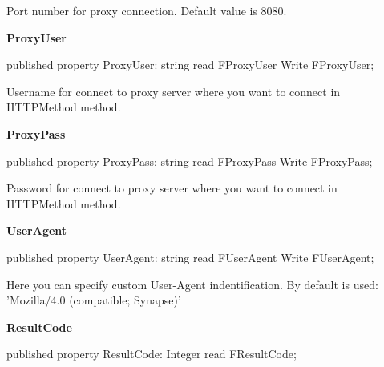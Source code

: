 \documentclass{report}
\newif\ifpdf
\begin{document}
\begin{list}{}
\begin{flushleft}
\ifpdf
\end{flushleft}
\fi


\par Port number for proxy connection. Default value is 8080.\label{httpsend.THTTPSend-ProxyUser}
\item[\textbf{ProxyUser}\hfill]
\ifpdf
\begin{flushleft}
\fi
\begin{ttfamily}
published property ProxyUser: string read FProxyUser Write FProxyUser;\end{ttfamily}

\ifpdf
\end{flushleft}
\fi


\par Username for connect to proxy server where you want to connect in HTTPMethod method.\label{httpsend.THTTPSend-ProxyPass}
\item[\textbf{ProxyPass}\hfill]
\ifpdf
\begin{flushleft}
\fi
\begin{ttfamily}
published property ProxyPass: string read FProxyPass Write FProxyPass;\end{ttfamily}

\ifpdf
\end{flushleft}
\fi


\par Password for connect to proxy server where you want to connect in HTTPMethod method.\label{httpsend.THTTPSend-UserAgent}
\item[\textbf{UserAgent}\hfill]
\ifpdf
\begin{flushleft}
\fi
\begin{ttfamily}
published property UserAgent: string read FUserAgent Write FUserAgent;\end{ttfamily}

\ifpdf
\end{flushleft}
\fi


\par Here you can specify custom User{-}Agent indentification. By default is used: 'Mozilla/4.0 (compatible; Synapse)'\label{httpsend.THTTPSend-ResultCode}
\item[\textbf{ResultCode}\hfill]
\ifpdf
\begin{flushleft}
\fi
\begin{ttfamily}
published property ResultCode: Integer read FResultCode;\end{ttfamily}


\end{flushleft}
\end{list}
\end{document}
